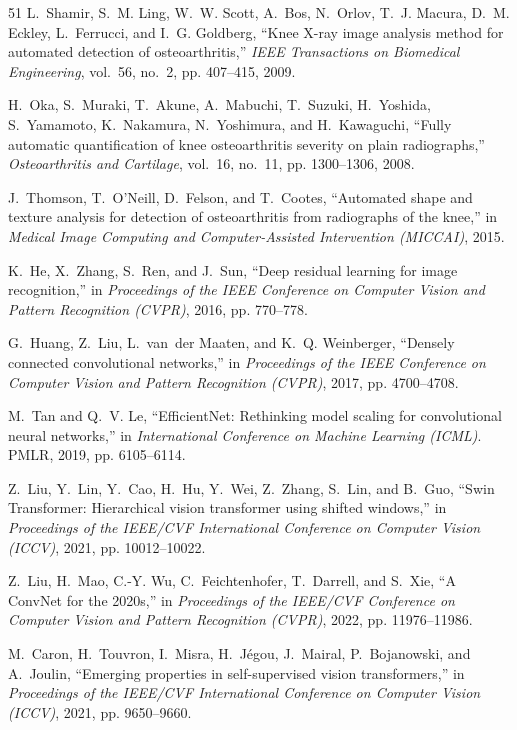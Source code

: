 \documentclass[10pt,journal]{IEEEtran}
\begin{document}
\begin{thebibliography}{51}
L.~Shamir, S.~M. Ling, W.~W. Scott, A.~Bos, N.~Orlov, T.~J. Macura, D.~M. Eckley, L.~Ferrucci, and I.~G. Goldberg, ``Knee X-ray image analysis method for automated detection of osteoarthritis,'' \emph{IEEE Transactions on Biomedical Engineering}, vol.~56, no.~2, pp. 407--415, 2009.

H.~Oka, S.~Muraki, T.~Akune, A.~Mabuchi, T.~Suzuki, H.~Yoshida, S.~Yamamoto, K.~Nakamura, N.~Yoshimura, and H.~Kawaguchi, ``Fully automatic quantification of knee osteoarthritis severity on plain radiographs,'' \emph{Osteoarthritis and Cartilage}, vol.~16, no.~11, pp. 1300--1306, 2008.

J.~Thomson, T.~O'Neill, D.~Felson, and T.~Cootes, ``Automated shape and texture analysis for detection of osteoarthritis from radiographs of the knee,'' in \emph{Medical Image Computing and Computer-Assisted Intervention (MICCAI)}, 2015.

K.~He, X.~Zhang, S.~Ren, and J.~Sun, ``Deep residual learning for image recognition,'' in \emph{Proceedings of the IEEE Conference on Computer Vision and Pattern Recognition (CVPR)}, 2016, pp. 770--778.

G.~Huang, Z.~Liu, L.~van~der Maaten, and K.~Q. Weinberger, ``Densely connected convolutional networks,'' in \emph{Proceedings of the IEEE Conference on Computer Vision and Pattern Recognition (CVPR)}, 2017, pp. 4700--4708.

M.~Tan and Q.~V. Le, ``EfficientNet: Rethinking model scaling for convolutional neural networks,'' in \emph{International Conference on Machine Learning (ICML)}. PMLR, 2019, pp. 6105--6114.

Z.~Liu, Y.~Lin, Y.~Cao, H.~Hu, Y.~Wei, Z.~Zhang, S.~Lin, and B.~Guo, ``Swin Transformer: Hierarchical vision transformer using shifted windows,'' in \emph{Proceedings of the IEEE/CVF International Conference on Computer Vision (ICCV)}, 2021, pp. 10012--10022.

Z.~Liu, H.~Mao, C.-Y. Wu, C.~Feichtenhofer, T.~Darrell, and S.~Xie, ``A ConvNet for the 2020s,'' in \emph{Proceedings of the IEEE/CVF Conference on Computer Vision and Pattern Recognition (CVPR)}, 2022, pp. 11976--11986.

M.~Caron, H.~Touvron, I.~Misra, H.~J{\'e}gou, J.~Mairal, P.~Bojanowski, and A.~Joulin, ``Emerging properties in self-supervised vision transformers,'' in \emph{Proceedings of the IEEE/CVF International Conference on Computer Vision (ICCV)}, 2021, pp. 9650--9660.


\end{thebibliography}
\end{document}
